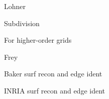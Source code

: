 \documentclass{article}
\begin{document}
Lohner\cite{lohner-regridding-surface}

Subdivision\cite{haimes-imr15-subdivision}

\cite{kim-takano-nakahashi-adjoint-adapt,kim-nakahashi-adjoint-adapt-viscous}

For higher-order grids\cite{unstruct-3d-ho-grid-dg-surf-recon}

Frey\cite{frey-imr9-about-surface-remeshing}

Baker surf recon and edge ident\cite{baker-imr13}

INRIA surf recon and edge ident\cite{borouchaki-surface-reconstruction}



\end{document}
